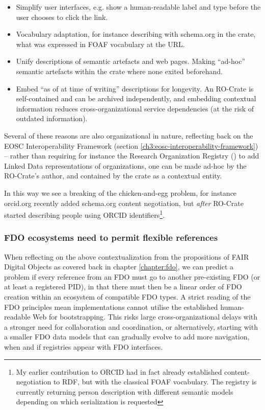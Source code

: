 \begin{itemize}
    \item Simplify user interfaces, e.g. show a human-readable label and type before the user chooses to click the link.
    \item Vocabulary adaptation, for instance describing with schema.org in the crate, what was expressed in FOAF vocabulary at the URL.
    \item Unify descriptions of semantic artefacts and web pages. 
          Making ``ad-hoc'' semantic artefacts within the crate where none exited beforehand.
    \item Embed ``as of at time of writing'' descriptions for longevity. 
          An RO-Crate is self-contained and can be archived independently, and embedding contextual information reduces cross-organizational service dependencies (at the risk of outdated information).
\end{itemize}

Several of these reasons are also organizational in nature, reflecting back on the EOSC Interoperability Framework (section \vref{ch3:eosc-interoperability-framework}) -- rather than requiring for instance the Research Organization Registry () to add Linked Data representations of organizations, one can be made ad-hoc by the RO-Crate's author, and contained by the crate as a contextual entity. 

In this way we see a breaking of the chicken-and-egg problem, for instance orcid.org recently added schema.org content negotiation, but \emph{after} RO-Crate started describing people using ORCID identifiers\footnote{
  My earlier contribution to ORCID had in fact already established content-negotiation to RDF, but with the classical FOAF vocabulary.
  The registry is currently returning person description with different semantic models depending on which serialization is requested}. 


\subsubsection{FDO ecosystems need to permit flexible references}

When reflecting on the above contextualization from the propositions of FAIR Digital Objects as covered back in chapter \ref{chapter:fdo}, we can predict a problem if every reference from an FDO must go to another pre-existing FDO (or at least a registered PID), in that there must then be a linear order of FDO creation within an ecosystem of compatible FDO types.
A strict reading of the FDO principles mean implementations cannot utilise the established human-readable Web for bootstrapping.
This risks large cross-organizational delays with a stronger need for collaboration and coordination, or alternatively, starting with a smaller FDO data models that can gradually evolve to add more navigation, when and if registries appear with FDO interfaces. 


